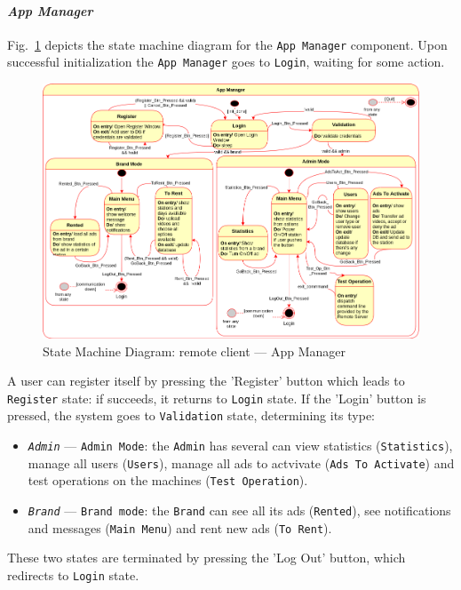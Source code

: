 \paragraph{\emph{App Manager}}
Fig.~\ref{fig:state-mach-rc-app-manag} depicts the state machine diagram for the
\texttt{App Manager} component.
Upon successful initialization the
\texttt{App Manager} goes to \texttt{Login}, waiting for some action. 
%
\begin{figure}[htb!]
\centering
    \includegraphics[width=1.0\columnwidth]{./img/state-mach-rc-app-manag.png}
  \caption{State Machine Diagram: remote client --- App Manager}%
\label{fig:state-mach-rc-app-manag}
\end{figure}
%

A user can register itself by pressing the 'Register' button which leads to \texttt{Register} state: if succeeds, it returns to \texttt{Login} state. 
If the 'Login' button is pressed, the system goes to \texttt{Validation} state,
determining its type:
\begin{itemize}
\item \emph{\texttt{Admin}} --- \texttt{Admin Mode}: the \texttt{Admin} has several can
  view statistics (\texttt{Statistics}), manage all users (\texttt{Users}),
  manage all ads to actvivate (\texttt{Ads To Activate}) and test operations on
  the machines (\texttt{Test Operation}).
\item \emph{\texttt{Brand}} --- \texttt{Brand mode}: the \texttt{Brand} can see all its ads (\texttt{Rented}), see notifications and messages (\texttt{Main Menu}) and rent new ads (\texttt{To Rent}). 
\end{itemize}
%
These two states are terminated by pressing the 'Log Out' button, which
redirects to \texttt{Login} state.

